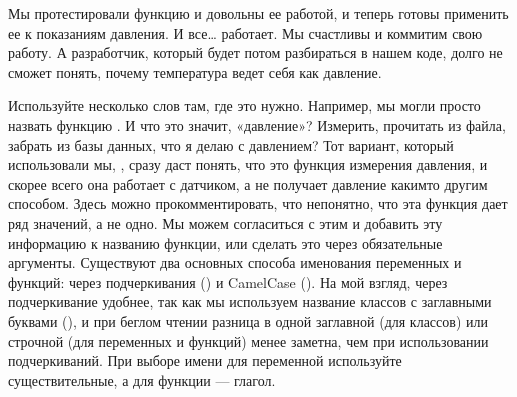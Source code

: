 \documentclass[letterpaper,10pt,russian]{sphinxmanual}
\begin{document}
\begin{sphinxVerbatim}[commandchars=\\\{\}]
 
       

  
  
\end{sphinxVerbatim}

\sphinxAtStartPar
Мы протестировали функцию и довольны ее работой, и теперь готовы применить ее к показаниям давления. И все… работает. Мы счастливы и коммитим свою работу. А разработчик, который будет потом разбираться в нашем коде, долго не сможет понять, почему температура ведет себя как давление.

\begin{sphinxVerbatim}[commandchars=\\\{\}]
  
  
\end{sphinxVerbatim}

\sphinxAtStartPar
Используйте несколько слов там, где это нужно. Например, мы могли просто назвать функцию .  И что это значит, «давление»? Измерить, прочитать из файла, забрать из базы данных, что я делаю с давлением? Тот вариант, который использовали мы, , сразу даст понять, что это функция измерения давления, и скорее всего она работает с датчиком, а не получает давление каким\sphinxhyphen{}то другим способом. Здесь можно прокомментировать, что непонятно, что эта функция дает ряд значений, а не одно. Мы можем согласиться с этим и добавить эту информацию к названию функции, или сделать это через обязательные аргументы.
Существуют два основных способа именования переменных и функций: через подчеркивания () и CamelCase (). На мой взгляд, через подчеркивание удобнее, так как мы используем название классов с заглавными буквами (), и при беглом чтении разница в одной заглавной (для классов) или строчной (для переменных и функций) менее заметна, чем при использовании подчеркиваний.
При выборе имени для переменной используйте существительные, а для функции — глагол.
\end{document}
